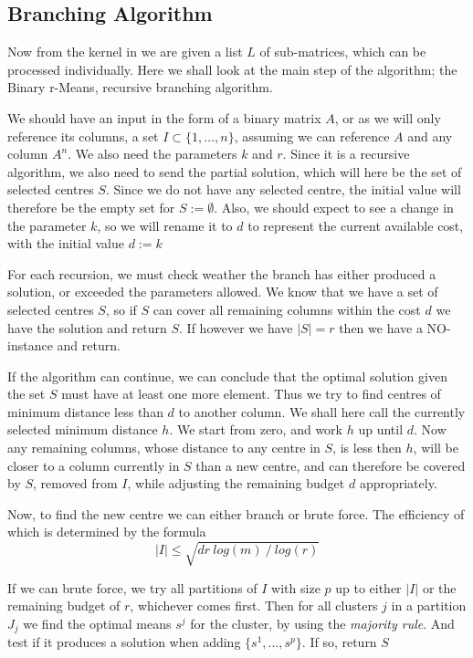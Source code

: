\documentclass[a4paper]{article}
\begin{document}
\subsection{Branching Algorithm}
\label{sec:algo:branching}
Now from the kernel in  we are given a list $L$ of sub-matrices, which can be processed individually. Here we
shall look at the main step of the algorithm; the Binary r-Means, recursive branching algorithm.

We should have an input in the form of a binary matrix $A$, or as we will only reference its columns, a set
$I \subset \{1,\dots,n\}$, assuming we can reference $A$ and any column $A^n$. We also need the parameters $k$ and $r$.
Since it is a recursive algorithm, we also need to send the partial solution, which will here be the set of selected
centres $S$. Since we do not have any selected centre, the initial value will therefore be the empty set for
$S := \emptyset$. Also, we should expect to see a change in the parameter $k$, so we will rename it to $d$ to represent the
current available cost, with the initial value $d := k$

For each recursion, we must check weather the branch has either produced a solution, or exceeded the parameters allowed. We know that
we have a set of selected centres $S$, so if $S$ can cover all remaining columns within the cost $d$ we have the solution and return $S$.
If however we have $|S| = r$ then we have a NO-instance and return.

If the algorithm can continue, we can conclude that the optimal solution given the set $S$ must have at least one more element. Thus
we try to find centres of minimum distance less than $d$ to another column. We shall here call the currently selected minimum
distance $h$. We start from zero, and work $h$ up until $d$. Now any remaining columns, whose distance to any centre in $S$,
is less then $h$, will be closer to a column currently in $S$ than a new centre, and can therefore be covered by $S$,
removed from $I$, while adjusting the remaining budget $d$ appropriately.

Now, to find the new centre we can either branch or brute force. The efficiency of which is determined by the formula
\[
    |I| \leq \sqrt{d r ~log(m) ~/ ~log(r)}
\]

If we can brute force, we try all partitions of $I$ with size $p$ up to either $|I|$ or the remaining budget of $r$, whichever comes first. Then
for all clusters $j$ in a partition $J_j$ we find the optimal means $s^j$ for the cluster, by using the \textit{majority rule}. And test if it produces
a solution when adding $\{s^1,\dots,s^p\}$. If so, return $S$
\end{document}
